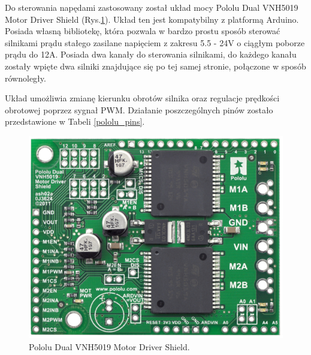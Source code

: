 Do sterowania napędami zastosowany został układ mocy Pololu Dual VNH5019 Motor Driver Shield (Rys.\ref{fig:pololu}). Układ ten jest kompatybilny z platformą Arduino. Posiada własną bibliotekę, która pozwala w bardzo prostu sposób sterować silnikami prądu stałego zasilane napięciem z zakresu 5.5 - 24V o ciągłym poborze prądu do 12A.  Posiada dwa kanały do sterowania silnikami, do każdego kanału zostały wpięte dwa silniki znajdujące się po tej samej stronie, połączone w sposób równoległy.   

Układ umożliwia zmianę kierunku obrotów silnika oraz regulacje prędkości obrotowej poprzez sygnał PWM. Działanie poszczególnych pinów zostało przedstawione w Tabeli \ref{pololu_pins}.

\begin{figure}[ht]
	\centering
	\includegraphics[scale=0.6]{pololu.png}
	\caption{Pololu Dual VNH5019 Motor Driver Shield.}
	\label{fig:pololu}
\end{figure}



